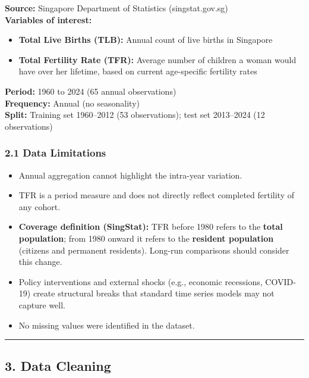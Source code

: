 \documentclass[
]{article}
\providecommand{\tightlist}{%
  \setlength{\itemsep}{0pt}\setlength{\parskip}{0pt}}
\begin{document}
\textbf{Source:} Singapore Department of Statistics (singstat.gov.sg)\\
\textbf{Variables of interest:}

\begin{itemize}
\tightlist
\item
  \textbf{Total Live Births (TLB):} Annual count of live births in
  Singapore
\item
  \textbf{Total Fertility Rate (TFR):} Average number of children a
  woman would have over her lifetime, based on current age-specific
  fertility rates
\end{itemize}

\textbf{Period:} 1960 to 2024 (65 annual observations)\\
\textbf{Frequency:} Annual (no seasonality)\\
\textbf{Split:} Training set 1960--2012 (53 observations); test set
2013--2024 (12 observations)

\subsubsection{2.1 Data Limitations}\label{data-limitations}

\begin{itemize}
\tightlist
\item
  Annual aggregation cannot highlight the intra-year variation.
\item
  TFR is a period measure and does not directly reflect completed
  fertility of any cohort.
\item
  \textbf{Coverage definition (SingStat):} TFR before 1980 refers to the
  \textbf{total population}; from 1980 onward it refers to the
  \textbf{resident population} (citizens and permanent residents).
  Long-run comparisons should consider this change.
\item
  Policy interventions and external shocks (e.g., economic recessions,
  COVID-19) create structural breaks that standard time series models
  may not capture well.
\item
  No missing values were identified in the dataset.
\end{itemize}

\begin{center}\rule{0.5\linewidth}{0.5pt}\end{center}

\subsection{3. Data Cleaning}\label{data-cleaning}
\end{document}
